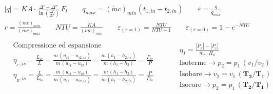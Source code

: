 \documentclass[9pt]{article}
\begin{document}
\begin{multicols}{2}
\begin{gather*}
		|q|=KA \cdot\frac{\Delta'-\Delta''}{\ln \left(\frac{\Delta'}{\Delta''}\right)} \, F_t \qquad q_{max} = (\dot{m}c)_{min}(t_{1,in} - t_{2,in}) \qquad \varepsilon = \frac{q}{q_{max}}  \\ r=\frac{(\dot{m}c)_{min}}{(\dot{m}c)_{max}}
		\qquad \textit{NTU} = \frac{KA}{(\dot{m}c)_{min}}\qquad
		\varepsilon_{(r=1)} = \frac{\textit{NTU}}{\textit{NTU} +1}\qquad \varepsilon_{(r=0)} = 1-e^{-\textit{NTU}}
		\\
		\begin{split}
			&\text{Compressione ed espansione}\\
			&\eta_{_C,is} = \frac{L_{is}}{L} = \frac{m \, (u_{i1} - u_{i2,is})}{m \, (u_{i1} - u_{i2})} = \frac{\dot{m} \, (h_{1} - h_{2,is})}{\dot{m} \, (h_{1} - h_{2})} = \frac{P_{is}}{P}\\ 
			&\eta_{_E,is} =\frac{L}{L_{is}} =  \frac{m \, (u_{i1} - u_{i2})}{m \, (u_{i1} - u_{i2,is})} = \frac{\dot{m} \, (h_{1} - h_{2})}{\dot{m} \, (h_{1} - h_{2,is})} =  \frac{P}{P_{is}}\\
		\end{split} \qquad
		\begin{split}
			\\
			& \eta_I = \frac{|P_{_E}|-|P_{_P}|}{\dot{m}_c \cdot H_0}\\
			& \text{Isoterme} \rightarrow p_2 = p_1 \, (v_1/v_2)\\
			& \text{Isobare} \rightarrow v_2 = v_1 \, (\mathbf{T_2}/\mathbf{T_1})\\
			& \text{Isocore} \rightarrow p_2 = p_1 \, (\mathbf{T_2}/\mathbf{T_1})
		\end{split}
	\end{gather*}
	
\end{multicols}
\end{document}
